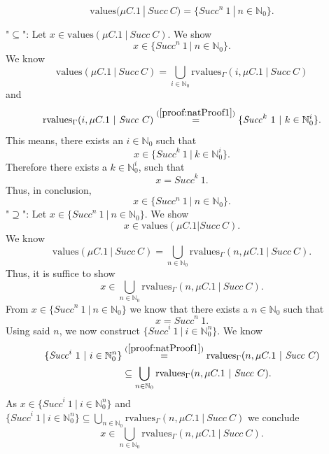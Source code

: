 \documentclass[]{scrbook}
\theoremstyle{definition}
\theoremstyle{definition}
\theoremstyle{definition}
\theoremstyle{remark}
\begin{document}
\begin{equation}\label{proof:natProof2}
\textrm{values}(\mu C.1\ |\ \mathit{Succ} \ C)=\{\mathit{Succ}^n \ 1\ |\ n\in\mathbb{N}_0\}.
\end{equation}\begin{addmargin}[1cm]{0cm}
"$\subseteq$":
Let $x\in\textrm{values}(\mu C.1\ |\ \mathit{Succ} \ C)$.
We show
$$
x\in\{\mathit{Succ}^n \ 1\ |\ n\in\mathbb{N}_0\}.
$$
We know
$$
\textrm{values}(\mu C.1\ |\ \mathit{Succ} \ C)=\bigcup_{i\in\mathbb{N}_0}\mathrm{rvalues}_\Gamma(i,\mu C.1\ |\ \mathit{Succ} \ C)
$$
and
$$
\mathrm{rvalues}_\Gamma(i,\mu C.1\ |\ \mathit{Succ} \ C)\overset{(\ref{proof:natProof1})}{=}\{\mathit{Succ}^k \ 1\ |\ k\in\mathbb{N}^i_0\}.
$$
This means, there exists an $i\in\mathbb{N}_0$ such that
$$
x\in\{\mathit{Succ}^k \ 1\ |\ k\in\mathbb{N}^i_0\}.
$$
Therefore there exists a $k\in\mathbb{N}^i_0$, such that
$$
x = \mathit{Succ}^k \ 1.
$$
Thus, in conclusion,
$$
x\in\{Succ^n \ 1\ |\ n\in\mathbb{N}_0\}.
$$
"$\supseteq$":
Let $x \in\{\mathit{Succ}^n \ 1\ |\ n\in\mathbb{N}_0\}$. We show 
$$
x \in \textrm{values}(\mu C.1| \mathit{Succ} \ C).
$$
We know
$$
\textrm{values}(\mu C.1\ |\ \mathit{Succ} \ C)=\bigcup_{n\in\mathbb{N}_0}\mathrm{rvalues}_\Gamma(n,\mu C.1\ |\ \mathit{Succ} \ C).
$$
Thus, it is suffice to show
$$
x \in \bigcup_{n\in\mathbb{N}_0}\mathrm{rvalues}_\Gamma(n,\mu C.1\ |\ \mathit{Succ} \ C).
$$
From $x \in\{\mathit{Succ}^n \ 1\ |\ n\in\mathbb{N}_0\}$ we know that there exists a $n\in\mathbb{N}_0$ such that 
$$x = \mathit{Succ}^n \ 1.$$
Using said $n$, we now construct $\{\mathit{Succ}^i \ 1\ |\ i\in\mathbb{N}^n_0\}$.
We know
$$
\begin{aligned}
\{\mathit{Succ}^i \ 1\ |\ i\in\mathbb{N}^n_0\}&\overset{(\ref{proof:natProof1})}{=} \mathrm{rvalues}_\Gamma(n,\mu C.1\ |\ \mathit{Succ} \ C)\\
&\subseteq\bigcup_{n\in\mathbb{N}_0}\mathrm{rvalues}_\Gamma(n,\mu C.1\ |\ \mathit{Succ} \ C).
\end{aligned}
$$
As $x \in\{\mathit{Succ}^i \ 1\ |\ i\in\mathbb{N}^n_0\}$ and $\{\mathit{Succ}^i \ 1 \ |\ i\in\mathbb{N}^n_0\}\subseteq\bigcup_{n\in\mathbb{N}_0}\mathrm{rvalues}_\Gamma(n,\mu C.1\ |\  \mathit{Succ} \ C)$ we conclude
$$
x \in \bigcup_{n\in\mathbb{N}_0}\mathrm{rvalues}_\Gamma(n,\mu C.1\ |\ \mathit{Succ} \ C).
$$
\end{addmargin}
\end{document}
